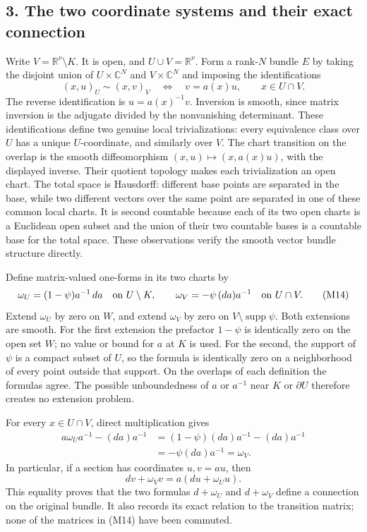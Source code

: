 \documentclass[
  11pt,
]{article}
\begin{document}
\subsection{3. The two coordinate systems and their exact
connection}\label{the-two-coordinate-systems-and-their-exact-connection}

Write \(V=\mathbb R^\nu\setminus K\). It is open, and
\(U\cup V=\mathbb R^\nu\). Form a rank-\(N\) bundle \(E\) by taking the
disjoint union of \(U\times\mathbb C^N\) and \(V\times\mathbb C^N\) and
imposing the identifications \[
(x,u)_U\sim(x,v)_V
\quad\Longleftrightarrow\quad
v=a(x)u,
\qquad x\in U\cap V.
\tag{M13}
\] The reverse identification is \(u=a(x)^{-1}v\). Inversion is smooth,
since matrix inversion is the adjugate divided by the nonvanishing
determinant. These identifications define two genuine local
trivializations: every equivalence class over \(U\) has a unique
\(U\)-coordinate, and similarly over \(V\). The chart transition on the
overlap is the smooth diffeomorphism \((x,u)\mapsto(x,a(x)u)\), with the
displayed inverse. Their quotient topology makes each trivialization an
open chart. The total space is Hausdorff: different base points are
separated in the base, while two different vectors over the same point
are separated in one of these common local charts. It is second
countable because each of its two open charts is a Euclidean open subset
and the union of their two countable bases is a countable base for the
total space. These observations verify the smooth vector bundle
structure directly.

Define matrix-valued one-forms in its two charts by \[
\omega_U=(1-\psi)a^{-1}\,da
\quad\hbox{on }U\setminus K,
\qquad
\omega_V=-\psi\,(da)a^{-1}
\quad\hbox{on }U\cap V.
\tag{M14}
\] Extend \(\omega_U\) by zero on \(W\), and extend \(\omega_V\) by zero
on \(V\setminus\operatorname{supp}\psi\). Both extensions are smooth.
For the first extension the prefactor \(1-\psi\) is identically zero on
the open set \(W\); no value or bound for \(a\) at \(K\) is used. For
the second, the support of \(\psi\) is a compact subset of \(U\), so the
formula is identically zero on a neighborhood of every point outside
that support. On the overlaps of each definition the formulas agree. The
possible unboundedness of \(a\) or \(a^{-1}\) near \(K\) or
\(\partial U\) therefore creates no extension problem.

For every \(x\in U\cap V\), direct multiplication gives \[
\begin{aligned}
a\omega_Ua^{-1}-(da)a^{-1}
&=(1-\psi)(da)a^{-1}-(da)a^{-1}\\
&=-\psi(da)a^{-1}=\omega_V.
\end{aligned}
\tag{M15}
\] In particular, if a section has coordinates \(u,v=a u\), then \[
dv+\omega_Vv=a(du+\omega_Uu).
\tag{M16}
\] This equality proves that the two formulas \(d+\omega_U\) and
\(d+\omega_V\) define a connection on the original bundle. It also
records its exact relation to the transition matrix; none of the
matrices in (M14) have been commuted.
\end{document}
